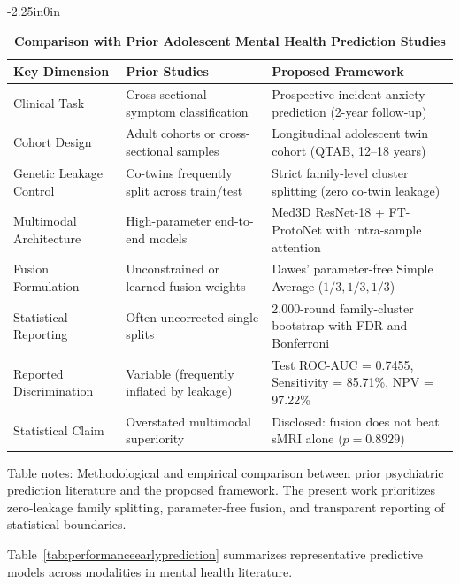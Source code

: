 \documentclass[10pt,letterpaper]{article}
\begin{document}
\begin{table}[!t]
\begin{adjustwidth}{-2.25in}{0in}
\centering
\caption{\textbf{Comparison with Prior Adolescent Mental Health Prediction Studies}}
\label{tab:prior_comparison}
\footnotesize
\renewcommand{\arraystretch}{1.15}
\begin{tabular}{|p{4.5cm}|p{5.5cm}|p{6.0cm}|}
\hline
\textbf{Key Dimension} & \textbf{Prior Studies} & \textbf{Proposed Framework} \\
\hline
Clinical Task & Cross-sectional symptom classification & Prospective incident anxiety prediction (2-year follow-up) \\
\hline
Cohort Design & Adult cohorts or cross-sectional samples & Longitudinal adolescent twin cohort (QTAB, 12--18 years) \\
\hline
Genetic Leakage Control & Co-twins frequently split across train/test & Strict family-level cluster splitting (zero co-twin leakage) \\
\hline
Multimodal Architecture & High-parameter end-to-end models & Med3D ResNet-18 + FT-ProtoNet with intra-sample attention \\
\hline
Fusion Formulation & Unconstrained or learned fusion weights & Dawes' parameter-free Simple Average ($1/3, 1/3, 1/3$) \\
\hline
Statistical Reporting & Often uncorrected single splits & 2,000-round family-cluster bootstrap with FDR and Bonferroni \\
\hline
Reported Discrimination & Variable (frequently inflated by leakage) & Test ROC-AUC = 0.7455, Sensitivity = 85.71\%, NPV = 97.22\% \\
\hline
Statistical Claim & Overstated multimodal superiority & Disclosed: fusion does not beat sMRI alone ($p = 0.8929$) \\
\hline
\end{tabular}
\begin{flushleft}
Table notes: Methodological and empirical comparison between prior psychiatric prediction literature and the proposed framework. The present work prioritizes zero-leakage family splitting, parameter-free fusion, and transparent reporting of statistical boundaries.
\end{flushleft}
\end{adjustwidth}
\end{table}

Table~\ref{tab:performanceearlyprediction} summarizes representative predictive models across modalities in mental health literature.
\end{document}
